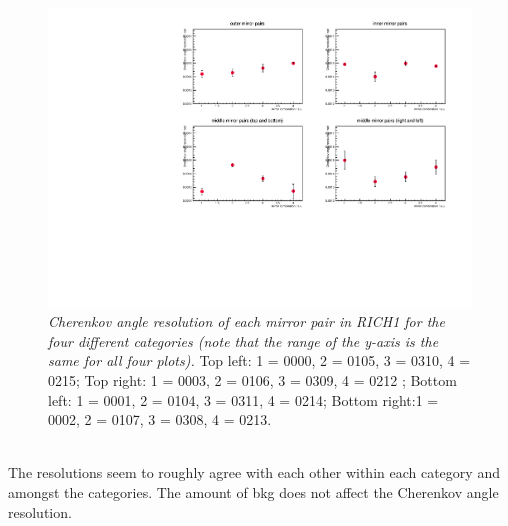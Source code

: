 \begin{figure}[!h]
	\vspace*{-0.cm}
	\begin{center}
		\includegraphics[width=1.\textwidth]{res_rich1.pdf}
		\vspace*{-1.5cm}
	\end{center}
	\caption{\textit{Cherenkov angle resolution of each mirror pair in RICH1 for the four different categories (note that the range of the y-axis is the same for all four plots).} Top left: 1 = 0000, 2 = 0105, 3 = 0310, 4 = 0215; Top right: 1 = 0003, 2 = 0106, 3 = 0309, 4 = 0212 ; Bottom left: 1 = 0001, 2 = 0104, 3 = 0311, 4 = 0214; Bottom right:1 = 0002, 2 = 0107, 3 = 0308, 4 = 0213. }
	\label{fig:rich1res}
\end{figure}
\\ 
The resolutions seem to roughly agree with each other within each category and amongst the categories. The amount of bkg does not affect the Cherenkov angle resolution.\\


\newpage
